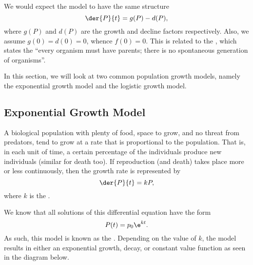 We would expect the model to have the same structure \[\der{P}{t} = g(P) - d(P),\] where $g(P)$ and $d(P)$ are the growth and decline factors respectively. Also, we assume $g(0) = d(0) = 0$, whence $f(0) = 0$. This is related to the , which states the ``every organism must have parents; there is no spontaneous generation of organisms''.

In this section, we will look at two common population growth models, namely the exponential growth model and the logistic growth model.

\subsection{Exponential Growth Model}

A biological population with plenty of food, space to grow, and no threat from predators, tend to grow at a rate that is proportional to the population. That is, in each unit of time, a certain percentage of the individuals produce new individuals (similar for death too). If reproduction (and death) takes place more or less continuously, then the growth rate is represented by \[\der{P}{t} = kP,\] where $k$ is the .

We know that all solutions of this differential equation have the form \[P(t) = p_0 \e^{k t}.\] As such, this model is known as the . Depending on the value of $k$, the model results in either an exponential growth, decay, or constant value function as seen in the diagram below.

\begin{figure}[H]
    \centering
    \caption{}
\end{figure}

